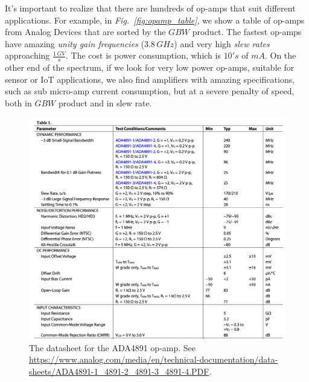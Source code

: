 It's important to realize that there are hundreds of op-amps that suit different applications.  For example, in \emph{Fig.~\ref{fig:opamp_table}}, we show a table of op-amps from Analog Devices that are sorted by the $GBW$ product.  The fastest op-amps have amazing \textit{unity gain frequencies} ($3.8\,GHz$) and very high \textit{slew rates} approaching $\frac{1\,GV}{s}$.  The cost is power consumption, which is $10's$ of $mA$.  On the other end of the spectrum, if we look for very low power op-amps, suitable for sensor or IoT applications, we also find amplifiers with amazing specifications, such as sub micro-amp current consumption, but at a severe penalty of speed, both in $GBW$ product and in slew rate.
\newpage
\begin{figure}[H]
\centering
\includegraphics[width=1\columnwidth]{ada4891_datasheet_table.png}
\caption{The datasheet for the ADA4891 op-amp.  See \url{https://www.analog.com/media/en/technical-documentation/data-sheets/ADA4891-1_4891-2_4891-3_4891-4.PDF}.}
\label{fig:adi_datasheet.png}
\end{figure}
\newpage
